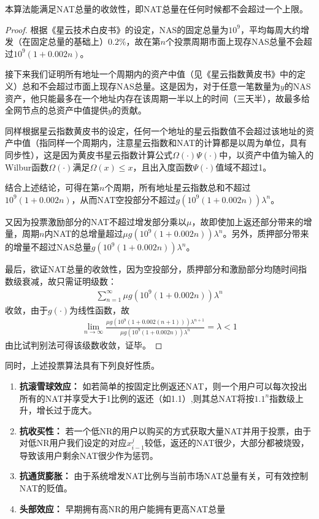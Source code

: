 \begin{property}
本算法能满足NAT总量的收敛性，即NAT总量在任何时候都不会超过一个上限。
\end{property}
\begin{proof}
	根据《星云技术白皮书》的设定，NAS的固定总量为$10^9$，平均每周大约增发（在固定总量的基础上）$0.2\%$，故在第$n$个投票周期市面上现存NAS总量不会超过$10^9(1+0.002n)$。
	
	接下来我们证明所有地址一个周期内的资产中值（见《星云指数黄皮书》中的定义）总和不会超过市面上现存NAS总量。这是因为，对于任意一笔数量为$y$的NAS资产，他只能最多在一个地址内存在该周期一半以上的时间（三天半），故最多给全网节点的总资产中值提供$y$的贡献。
	
	同样根据星云指数黄皮书的设定，任何一个地址的星云指数值不会超过该地址的资产中值（指同样一个周期内，注意星云指数和NAT的计算都是以周为单位，具有同步性），这是因为黄皮书星云指数计算公式$\Omega(\cdot)\Psi(\cdot)$中，以资产中值为输入的Wilbur函数$\Omega(\cdot)$满足$\Omega(x)\leq x$，且出入度函数$\Psi(\cdot)$值域不超过1。
	
	结合上述结论，可得在第$n$个周期，所有地址星云指数总和不超过$10^9(1+0.002n)$，从而NAT空投部分不超过$g(10^9(1+0.002n))\lambda^n$。
	
	又因为投票激励部分的NAT不超过增发部分乘以$\mu$，故即使加上返还部分带来的增量，周期$n$内NAT的总增量超过$\mu g(10^9(1+0.002n))\lambda^n$。另外，质押部分带来的增量不超过NAS总量$g(10^9(1+0.002n))\lambda^n$。
	
	最后，欲证NAT总量的收敛性，因为空投部分，质押部分和激励部分均随时间指数级衰减，故只需证明级数：
	\begin{align}
	\sum_{n=1}^{\infty} \mu g(10^9(1+0.002n))\lambda^n
	\end{align}
	收敛，由于$g(\cdot)$为线性函数，故
	\begin{align}
	\lim_{n\rightarrow \infty} \frac{\mu g(10^9(1+0.002(n+1)))\lambda^{n+1}}{\mu g(10^9(1+0.002n))\lambda^n} = \lambda <1
	\end{align}
	由比试判别法可得该级数收敛，证毕。
\end{proof}
同时，上述投票算法具有下列良好性质。
\begin{enumerate}
	\item \textbf{抗滚雪球效应：} 如若简单的按固定比例返还NAT，则一个用户可以每次投出所有的NAT并享受大于1比例的返还（如1.1）,则其总NAT将按$1.1^n$指数级上升，增长过于庞大。
	\item \textbf{抗收买性：} 若一个低NR的用户以购买的方式获取大量NAT并用于投票，由于对低NR用户我们设定的对应$x_{i-1}^j$较低，返还的NAT很少，大部分都被烧毁，导致该用户剩余NAT很少作为惩罚。
	\item \textbf{抗通货膨胀：} 由于系统增发NAT比例与当前市场NAT总量有关，可有效控制NAT的贬值。
	\item \textbf{头部效应：} 早期拥有高NR的用户能拥有更高NAT总量
\end{enumerate}